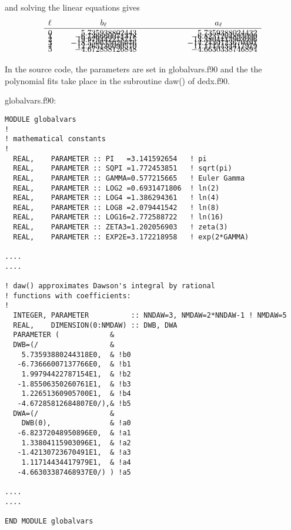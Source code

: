 \documentclass[preprint,12pt,eqsecnum,nofootinbib,amsmath,amssymb]{revtex4}
\begin{document}
and solving the linear equations gives
\begin{eqnarray}
  \begin{array}{lrr}
  \ell~~~~ & \hfill b_\ell \hfill & \hskip3cm a_\ell \hskip1.5cm  \\ \hline
  0    &    5.735938802443  &   5.7359388024432  \\[-8pt]
  1    &   -6.736660071378  &  -6.8237204895090  \\[-8pt]
  2    &   19.979442278715  &  13.3804115903096  \\[-8pt]
  3    &  -18.550635026076  & -14.2130723670491  \\[-8pt]
  4    &   12.265136090570  &  11.1714434417979  \\[-8pt]
  5    &   -4.672858126848  &  -4.6630338746894 
  \end{array}   
\end{eqnarray}

\vskip0.1cm 
In the source code, the parameters are set in {\rm 
globalvars.f90} and the the polynomial fits take place 
in the subroutine {\rm daw()} of {\rm dedx.f90}. 
\vskip1cm 

{
\noindent
globalvars.f90:
\baselineskip12pt
\begin{verbatim}
MODULE globalvars
!
! mathematical constants
!
  REAL,    PARAMETER :: PI   =3.141592654   ! pi
  REAL,    PARAMETER :: SQPI =1.772453851   ! sqrt(pi)
  REAL,    PARAMETER :: GAMMA=0.577215665   ! Euler Gamma
  REAL,    PARAMETER :: LOG2 =0.6931471806  ! ln(2)
  REAL,    PARAMETER :: LOG4 =1.386294361   ! ln(4)
  REAL,    PARAMETER :: LOG8 =2.079441542   ! ln(8)
  REAL,    PARAMETER :: LOG16=2.772588722   ! ln(16)
  REAL,    PARAMETER :: ZETA3=1.202056903   ! zeta(3)
  REAL,    PARAMETER :: EXP2E=3.172218958   ! exp(2*GAMMA)

....
....

! daw() approximates Dawson's integral by rational
! functions with coefficients:
!
  INTEGER, PARAMETER          :: NNDAW=3, NMDAW=2*NNDAW-1 ! NMDAW=5
  REAL,    DIMENSION(0:NMDAW) :: DWB, DWA
  PARAMETER (            &
  DWB=(/                 &
    5.73593880244318E0,  & !b0
   -6.73666007137766E0,  & !b1
    1.99794422787154E1,  & !b2
   -1.85506350260761E1,  & !b3
    1.22651360905700E1,  & !b4
   -4.67285812684807E0/),& !b5
  DWA=(/                 &
    DWB(0),              & !a0
   -6.82372048950896E0,  & !a1
    1.33804115903096E1,  & !a2
   -1.42130723670491E1,  & !a3
    1.11714434417979E1,  & !a4
   -4.66303387468937E0/) ) !a5

....
....

END MODULE globalvars
\end{verbatim}
}
\end{document}
